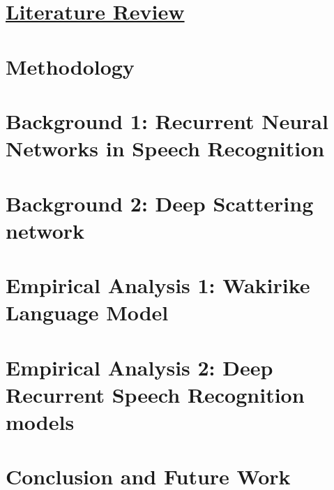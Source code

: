 \documentclass[12pt,twoside]{report}
\begin{document}
\chapter{\href{https://docs.google.com/document/d/1h8ZEcfEUpjJM6wYkgYYH-ryuiBFYVGSQA-Sf1StQtiY/edit#heading=h.i9tlo6ovvcpr}{Literature Review}}\label{c02}\label{ch2litrev}


\chapter{Methodology}\label{ch3Method}


\chapter{Background 1: Recurrent Neural Networks in Speech Recognition}\label{ch3RNN}


\chapter{Background 2: Deep Scattering network}\label{ch4DSN}


\chapter{Empirical Analysis 1: Wakirike Language Model}\label{ch6_wlm}


\chapter{Empirical Analysis 2: Deep Recurrent Speech Recognition models}\label{ch6_speech}


\chapter{Conclusion and Future Work}\label{ch8_future}

\end{document}
